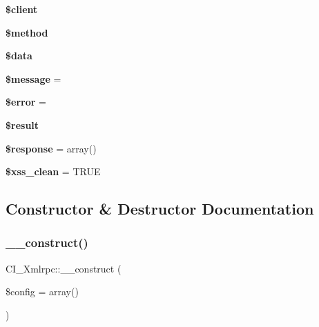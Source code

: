 \begin{DoxyCompactItemize}
{\bfseries \$client}
\item 
\mbox{\label{class_c_i___xmlrpc_aab2248b2084dcb5ea1dea48848894168}} 
{\bfseries \$method}
\item 
\mbox{\label{class_c_i___xmlrpc_a798b08bb0dd44df863fe7a30eaf11381}} 
{\bfseries \$data}
\item 
\mbox{\label{class_c_i___xmlrpc_a11c8bb10708a78fa34b2b00b192b2e3a}} 
{\bfseries \$message} = \textquotesingle{}\textquotesingle{}
\item 
\mbox{\label{class_c_i___xmlrpc_a61f190af2f217f0b861c9ef5afbd6e36}} 
{\bfseries \$error} = \textquotesingle{}\textquotesingle{}
\item 
\mbox{\label{class_c_i___xmlrpc_a6397f4eea33ca35d7015ab7a011ec18d}} 
{\bfseries \$result}
\item 
\mbox{\label{class_c_i___xmlrpc_a1394094101c82a37e1c4ad3aa334c362}} 
{\bfseries \$response} = array()
\item 
\mbox{\label{class_c_i___xmlrpc_a8f03e814995774954ed25571c27590ad}} 
{\bfseries \$xss\+\_\+clean} = T\+R\+UE
\end{DoxyCompactItemize}


\subsection{Constructor \& Destructor Documentation}
\mbox{\label{class_c_i___xmlrpc_aacd36988a211d86047f6268894214cdf}} 
\subsubsection{\texorpdfstring{\+\_\+\+\_\+construct()}{\_\_construct()}}
{\footnotesize\ttfamily C\+I\+\_\+\+Xmlrpc\+::\+\_\+\+\_\+construct (\begin{DoxyParamCaption}\item[{}]{\$config = {\ttfamily array()} }\end{DoxyParamCaption})}

